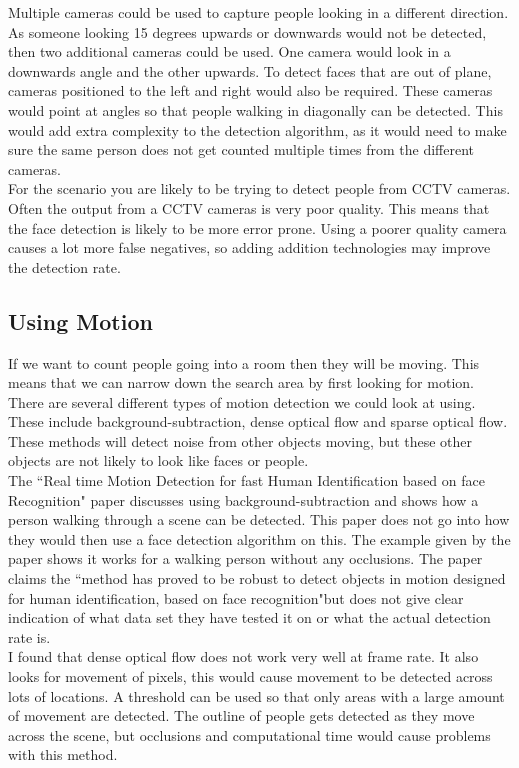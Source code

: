 \documentclass[10pt,a4paper,openbib]{article}
\begin{document}
\begin{multicols}{2}
\noindent Multiple cameras could be used to capture people looking in a different direction. As someone looking 15 degrees upwards or downwards would not be detected, then two additional cameras could be used. One camera would look in a downwards angle and the other upwards. To detect faces that are out of plane, cameras positioned to the left and right would also be required. These cameras would point at angles so that people walking in diagonally can be detected. This would add extra complexity to the detection algorithm, as it would need to make sure the same person does not get counted multiple times from the different cameras. \\

\noindent For the scenario you are likely to be trying to detect people from CCTV cameras. Often the output from a CCTV cameras is very poor quality. This means that the face detection is likely to be more error prone. Using a poorer quality camera causes a lot more false negatives, so adding addition technologies may improve the detection rate.

\subsection{Using Motion}
If we want to count people going into a room then they will be moving. This means that we can narrow down the search area by first looking for motion. There are several different types of motion detection we could look at using. These include background-subtraction, dense optical flow and sparse optical flow. These methods will detect noise from other objects moving, but these other objects are not likely to look like faces or people. \\

\noindent The ``Real time Motion Detection for fast Human Identification based on face Recognition"\cite{motionDetection} paper discusses using background-subtraction and shows how a person walking through a scene can be detected. This paper does not go into how they would then use a face detection algorithm on this. The example given by the paper shows it works for a walking person without any occlusions. The paper claims the ``method has proved to be robust to detect objects in motion designed for human identification, based on face recognition"\cite{motionDetection}but does not give clear indication of what data set they have tested it on or what the actual detection rate is. \\

\noindent I found that dense optical flow does not work very well at frame rate. It also looks for movement of pixels, this would cause movement to be detected across lots of locations. A threshold can be used so that only areas with a large amount of movement are detected. The outline of people gets detected as they move across the scene, but occlusions and computational time would cause problems with this method. \\


\end{multicols}
\end{document}
